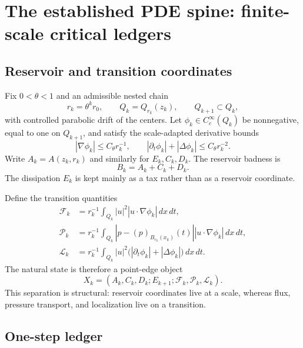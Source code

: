 \documentclass[11pt]{article}
\numberwithin{equation}{section}
\theoremstyle{remark}
\newcommand{\dxdt}{\,dx\,dt}
\newcommand{\abs}[1]{\left|#1\right|}
\newcommand{\calF}{\mathcal F}
\newcommand{\calL}{\mathcal L}
\newcommand{\calP}{\mathcal P}
\begin{document}
\section{The established PDE spine: finite-scale critical ledgers}\label{sec:ledger}

\subsection{Reservoir and transition coordinates}

Fix $0<\theta<1$ and an admissible nested chain
\[
r_k=\theta^kr_0,
\qquad
Q_k=Q_{r_k}(z_k),
\qquad
Q_{k+1}\subset Q_k,
\]
with controlled parabolic drift of the centers. Let $\phi_k\in C_c^\infty(Q_k)$ be nonnegative, equal to one on $Q_{k+1}$, and satisfy the scale-adapted derivative bounds
\[
|\nabla\phi_k|\le C_\theta r_k^{-1},
\qquad
|\partial_t\phi_k|+|\Delta\phi_k|\le C_\theta r_k^{-2}.
\]
Write $A_k=A(z_k,r_k)$ and similarly for $E_k,C_k,D_k$. The reservoir badness is
\begin{equation}\label{eq:reservoir}
B_k=A_k+C_k+D_k.
\end{equation}
The dissipation $E_k$ is kept mainly as a tax rather than as a reservoir coordinate.

Define the transition quantities
\begin{align}
\calF_k&=r_k^{-1}\int_{Q_k}|u|^2|u\cdot\nabla\phi_k|\dxdt,\label{eq:flux-supply}\\
\calP_k&=r_k^{-1}\int_{Q_k}
\abs{p-(p)_{B_{r_k}(x_k)}(t)}|u\cdot\nabla\phi_k|\dxdt,\label{eq:pressure-supply}\\
\calL_k&=r_k^{-1}\int_{Q_k}|u|^2
\bigl(|\partial_t\phi_k|+|\Delta\phi_k|\bigr)\dxdt.\label{eq:cutoff-leak}
\end{align}
The natural state is therefore a point-edge object
\begin{equation}\label{eq:point-edge}
X_k=(A_k,C_k,D_k;E_{k+1};\calF_k,\calP_k,\calL_k).
\end{equation}
This separation is structural: reservoir coordinates live at a scale, whereas flux, pressure transport, and localization live on a transition.

\subsection{One-step ledger}
\end{document}
